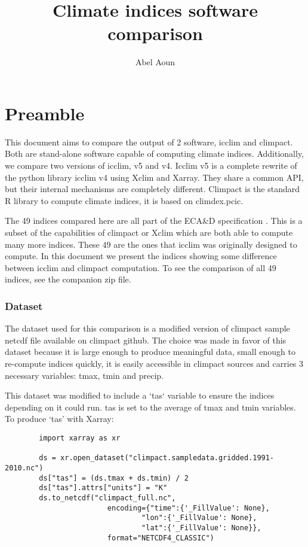 \documentclass[a4paper,11pt]{article}
\title{Climate indices software comparison}
\author{Abel Aoun}
\begin{document}
\maketitle
\part*{Preamble}
    This document aims to compare the output of 2 software, icclim \cite{gh/icclim} and climpact\cite{gh/climpact}. Both are stand-alone software capable of computing climate indices.
    Additionally, we compare two versions of icclim, v5 and v4.
    Icclim v5 is a complete rewrite of the python library icclim v4 using Xclim\cite{gh/xclim} and Xarray\cite{gh/xarray}. They share a common API, but their internal mechanisms are completely different.
    Climpact is the standard R library to compute climate indices, it is based on climdex.pcic\cite{gh/climdex}.

    The 49 indices compared here are all part of the ECA\&D specification
    \cite{doc/ecad_new}.
    This is a subset of the capabilities of climpact or Xclim which are both able to compute many 
    more indices.
    These 49 are the ones that icclim was originally designed to compute.
    In this document we present the indices showing some difference between icclim and climpact computation.
    To see the comparison of all 49 indices, see the companion zip file.
\section{Dataset}
    The dataset used for this comparison is a modified version of climpact sample netcdf file available on climpact github\cite{gh/climpact}.
    The choice was made in favor of this dataset because it is large enough to produce meaningful data,
    small enough to re-compute indices quickly, it is easily accessible in climpact sources and carries 3 necessary variables: tmax, tmin and precip.

    This dataset was modified to include a `tas` variable to ensure the indices depending on it could
    run. tas is set to the average of tmax and tmin variables.
    To produce `tas' with Xarray:
    \begin{lstlisting}
        import xarray as xr

        ds = xr.open_dataset("climpact.sampledata.gridded.1991-2010.nc")
        ds["tas"] = (ds.tmax + ds.tmin) / 2
        ds["tas"].attrs["units"] = "K"
        ds.to_netcdf("climpact_full.nc",
                        encoding={"time":{'_FillValue': None},
                                "lon":{'_FillValue': None},
                                "lat":{'_FillValue': None}},
                        format="NETCDF4_CLASSIC")
    \end{lstlisting}
\end{document}
